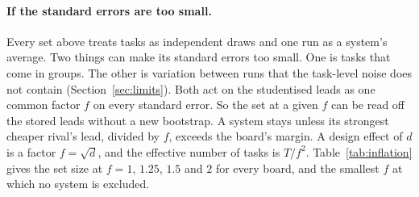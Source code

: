 \documentclass[11pt]{article}
\begin{document}
\paragraph{If the standard errors are too small.}
\label{sec:inflation}
Every set above treats tasks as independent draws and one run as a system's average. Two things can make its standard errors too small. One is tasks that come in groups. The other is variation between runs that the task-level noise does not contain (Section~\ref{sec:limits}). Both act on the studentised leads as one common factor $f$ on every standard error. So the set at a given $f$ can be read off the stored leads without a new bootstrap. A system stays unless its strongest cheaper rival's lead, divided by $f$, exceeds the board's margin. A design effect of $d$ is a factor $f=\sqrt d$, and the effective number of tasks is $T/f^2$. Table~\ref{tab:inflation} gives the set size at $f=1$, $1.25$, $1.5$ and $2$ for every board, and the smallest $f$ at which no system is excluded.
\begin{table}[!tbp]
\centering\small
\resizebox{0.85\textwidth}{!}{}
\caption{Frontier set size if every standard error were $f$ times the one used. The HAL boards are above the line and the HELM boards below it. $f=1$ is the set of Tables~\ref{tab:hal} and~\ref{tab:helm}. Whole board: the smallest $f$ at which every system stays in the set. Measured run-level sd: the HAL set under the run-level excess measured from the rerun pairs (Section~\ref{sec:limits}). $\dagger$: cost is a fixed number per system. The step from $f=1$ to $f=1.5$ is the effect of a design effect of $2.25$, or of a run-level standard deviation about as large as the standard error already used.}
\label{tab:inflation}
\end{table}
\end{document}
